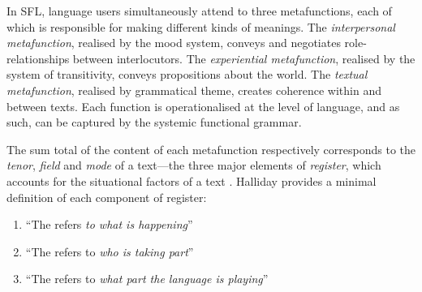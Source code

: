 			In SFL, language users simultaneously attend to three metafunctions, each of which is responsible for making different kinds of meanings. The \emph{interpersonal metafunction}, realised by the mood system, conveys and negotiates role-relationships between interlocutors. The \emph{experiential metafunction}, realised by the system of transitivity, conveys propositions about the world. The \emph{textual metafunction}, realised by grammatical theme, creates coherence within and between texts. Each function is operationalised at the  level of language, and as such, can be captured by the systemic functional grammar.


	  The sum total of the content of each metafunction respectively corresponds to the \emph{tenor}, \emph{field} and \emph{mode} of a text---the three major elements of \emph{register}, which accounts for the situational factors of a text \cite{halliday_language_1989}. Halliday provides a minimal definition of each component of register:

			   \begin{enumerate}
			   \item  ``The  refers \emph{to what is happening}''
			   \item ``The  refers to \emph{who is taking part}''
			   \item ``The  refers to \emph{what part the language is playing}'' \cite[p.~12]{halliday_language_1989}
			   \end{enumerate}

